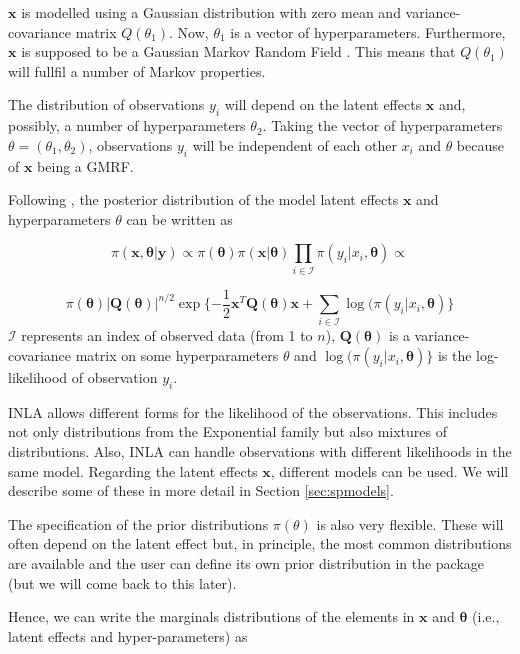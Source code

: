 \documentclass[article]{jss}
\begin{document}
$\mathbf{x}$ is modelled using a Gaussian distribution with zero mean and
variance-covariance matrix $Q(\theta_1)$. Now, $\theta_1$ is a vector of
hyperparameters. Furthermore, $\mathbf{x}$ is supposed to be a Gaussian Markov
Random Field \citep[GMRF,][]{rueheld:2005}. This means that  $Q(\theta_1)$ will fullfil a number of
Markov properties. 

The distribution of observations $y_i$ will depend on the latent effects
$\mathbf{x}$ and, possibly, a number of hyperparameters $\theta_2$.  Taking
the vector of hyperparameters $\theta=(\theta_1, \theta_2)$, observations
$y_i$ will be independent of each other $x_i$ and $\theta$ because
of $\mathbf{x}$ being a GMRF.

Following \citet{isi:000264374200002}, the posterior distribution of the model
latent effects $\mathbf{x}$ and hyperparameters $\theta$ can be written as 

$$
\pi(\mathbf{x}, \mathbf{\theta}|\mathbf{y}) \propto
\pi(\mathbf{\theta}) \pi(\mathbf{x}|\mathbf{\theta})\prod_{i\in \mathcal{I}}\pi(y_i|x_i,\mathbf{\theta})
\propto 
$$

$$
\pi(\mathbf{\theta}) |\mathbf{Q}(\mathbf{\theta})|^{n/2} \exp\{-\frac{1}{2}\mathbf{x}^T \mathbf{Q}(\mathbf{\theta}) \mathbf{x}+\sum_{i\in\mathcal{I}} \log(\pi(y_i|x_i, \mathbf{\theta}) \}
$$
\noindent
$\mathcal{I}$ represents an index of observed data (from 1 to $n$),
$\mathbf{Q}(\mathbf{\theta})$ is a variance-covariance matrix on some
hyperparameters $\theta$ and $\log(\pi(y_i|x_i, \mathbf{\theta}) \}$ is
the log-likelihood of observation $y_i$.

INLA allows different forms for the likelihood of the observations.  This
includes not only distributions from the Exponential family but also mixtures
of distributions. Also, INLA can handle observations with different likelihoods
in the same model. Regarding the latent effects $\mathbf{x}$, different models
can be used. We will describe some of these in more detail in Section
\ref{sec:spmodels}.


The specification of the prior distributions $\pi(\theta)$ is also very 
flexible. These will often depend on the latent effect but, in principle,
the most common distributions are available and the user can define its
own prior distribution in the  package (but we will come
back to this later). 

Hence, we can write the marginals distributions of the elements in $\mathbf{x}$
and $\mathbf{\theta}$ (i.e., latent effects and hyper-parameters) as
\end{document}
